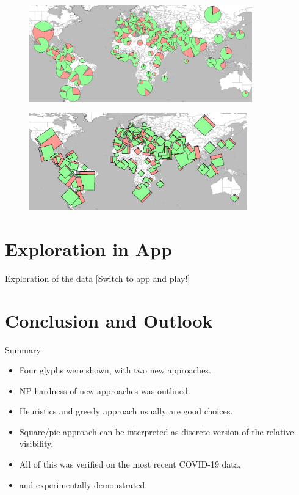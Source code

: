 \documentclass{beamer}
\begin{document}
\begin{frame}
  \begin{figure}[!b]
    \centering
    \includegraphics[height=4.2cm]{assets/pieChartsEval.png}
  \end{figure}

  \begin{figure}[b]
    \centering
    \includegraphics[height=4.2cm]{assets/squaresEval.png}
  \end{figure}
\end{frame}



\section{Exploration in App}

\begin{frame}{Exploration of the data}
  [Switch to app and play!]
\end{frame}

\section{Conclusion and Outlook}

\begin{frame}{Summary}

  \begin{itemize}
    \item Four glyphs were shown, with two new approaches.
    \item NP-hardness of new approaches was outlined.
    \item Heuristics and greedy approach usually are good choices.
    \item Square/pie approach can be interpreted as discrete version of the relative visibility.
    \item All of this was verified on the most recent COVID-19 data,
    \item and experimentally demonstrated.
  \end{itemize}
\end{frame}
\end{document}
